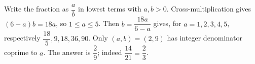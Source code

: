 Write the fraction as $\dfrac{a}{b}$ in lowest terms with $a,b>0$. Cross-multiplication gives $(6-a)b=18a$, so $1\le a\le5$. Then $b=\dfrac{18a}{6-a}$ gives, for $a=1,2,3,4,5$, respectively $\dfrac{18}{5},9,18,36,90$. Only $(a,b)=(2,9)$ has integer denominator coprime to $a$. The answer is $\boxed{\dfrac{2}{9}}$; indeed $\dfrac{14}{21}=\dfrac{2}{3}$.
